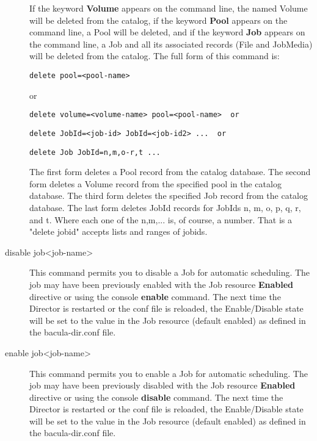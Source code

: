 \begin{description}
   If the keyword {\bf Volume} appears on the command line, the named
   Volume will be deleted from the catalog, if the keyword {\bf Pool}
   appears on the command line, a Pool will be deleted, and if the keyword
   {\bf Job} appears on the command line, a Job and all its associated
   records (File and JobMedia) will be deleted from the catalog.  The full
   form of this command is:

\begin{verbatim}
delete pool=<pool-name>
\end{verbatim}

   or

\begin{verbatim}
delete volume=<volume-name> pool=<pool-name>  or
\end{verbatim}

\begin{verbatim}
delete JobId=<job-id> JobId=<job-id2> ...  or
\end{verbatim}

\begin{verbatim}
delete Job JobId=n,m,o-r,t ...
\end{verbatim}

   The first form deletes a Pool record from the catalog database.  The
   second form deletes a Volume record from the specified pool in the
   catalog database.  The third form deletes the specified Job record from
   the catalog database.  The last form deletes JobId records for JobIds
   n, m, o, p, q, r, and t.  Where each one of the n,m,...  is, of course, a
   number. That is a "delete jobid" accepts lists and ranges of
   jobids.

\item [disable job{\textless}job-name{\textgreater}]
  This command permits you to disable a Job for automatic scheduling.
  The job may have been previously enabled with the Job resource
  {\bf Enabled} directive or using the console {\bf enable} command.
  The next time the Director is restarted or the conf file is reloaded,
  the Enable/Disable state will be set to the value in the Job resource
  (default enabled) as defined in the bacula-dir.conf file.

\item [enable job{\textless}job-name{\textgreater}]
  This command permits you to enable a Job for automatic scheduling.
  The job may have been previously disabled with the Job resource
  {\bf Enabled} directive or using the console {\bf disable} command.
  The next time the Director is restarted or the conf file is reloaded,
  the Enable/Disable state will be set to the value in the Job resource
  (default enabled) as defined in the bacula-dir.conf file.


\end{description}
